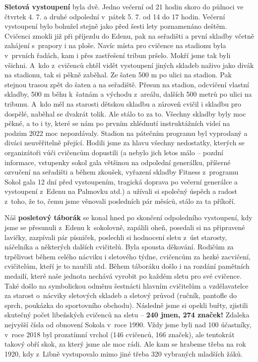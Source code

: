 \documentclass[11pt]{article}
\begin{document}
\textbf{Sletová vystoupení} byla dvě. Jedno večerní od 21 hodin skoro do půlnoci ve čtvrtek 4. 7. a druhé odpolední v~pátek 5. 7. od 14 do 17 hodin. Večerní vystoupení bylo bohužel stejně jako před šesti lety poznamenáno deštěm. Cvičenci zmokli již při příjezdu do Edenu, pak na seřadišti a první skladby včetně zahájení s~prapory i na ploše. Navíc místa pro cvičence na stadionu byla v~prvních řadách, kam i přes zastřešení tribun pršelo. Mokří jsme tak byli všichni. A~kdo z~cvičenců chtěl vidět vystoupení jiných skladeb naživo jako divák na stadionu, tak si pěkně zaběhal. Ze šaten 500 m po ulici na stadion. Pak stejnou trasou zpět do šaten a na seřadiště. Přesun na stadion, odcvičení vlastní skladby, 500 m běhu k~šatnám a východu z~areálu, dalších 500 metrů po ulici na tribunu. A~kdo měl na starosti dětskou skladbu a zároveň cvičil i skladbu pro dospělé, naběhal se dvakrát tolik. Ale stálo to za to. Všechny skladby byly moc pěkné, a to i ty, které se nám po prvním zhlédnutí instruktážních videí na podzim 2022 moc nepozdávaly. Stadion na pátečním programu byl vyprodaný a diváci neuvěřitelně přející. Hodili jsme za hlavu všechny nedostatky, kterých se organizátoři vůči cvičencům dopustili (a nebylo jich letos málo – pozdní informace, vstupenky sokol gala většinou na odpolední generálku, příšerné ozvučení na seřadišti a během zkoušek, vyřazení skladby Fitness z~programu Sokol gala 12 dní před vystoupením, tragická doprava po večerní generálce a vystoupení z~Edenu na Palmovku atd.) a užívali si společný úspěch a radost z~toho, že to, čemu jsme věnovali posledních pár měsíců, stálo za ta příkoří.

Náš \textbf{posletový táborák} se konal hned po skončení odpoledního vystoupení, kdy jsme se přesunuli z~Edenu k~sokolovně, zapálili oheň, posedali si na připravené lavičky, zazpívali pár písniček, poslechli si hodnocení sletu z~úst starosty, náčelníka a některých dalších cvičitelů. Byla spousta děkování. Rodičům za trpělivost během celého nácviku i sletového týdne, cvičencům za hezké zacvičení, cvičitelům, kteří je to naučili atd. Během táboráku došlo i na rozdání pamětních medailí, které naše jednota nechává vyrobit po každém sletu pro své cvičence. Také došlo na symbolickou odměnu šestnácti hlavním cvičitelům a vzdělavatelce za starost o~nácviky sletových skladeb a sletový průvod (ručník, pantofle do sprch, poukázka do sportovního obchodu). Následně jsme si opekli buřty, zjistili skutečný počet libeňských cvičenců na sletu – \textbf{240 jmen, 274 značek!} Zdaleka nejvyšší čísla od obnovení Sokola v~roce 1990. Vždy jsme byli nad 100 účastníky, v~roce 2018 byl prozatímní vrchol (146 cvičenců, 166 značek), ale tentokrát takový obří skok, za který jsme ale moc rádi. Ale kam se hrabeme třeba na rok 1920, kdy z~Libně vystupovalo mimo jiné třeba 320 vybraných mladších žáků. 
\end{document}
